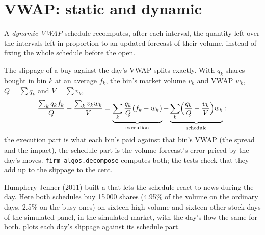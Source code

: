 \section{VWAP: static and dynamic}

\begin{definition}\label{def:mx:benchmark-algorithms:dvwap}
A \emph{dynamic VWAP} schedule recomputes, after each interval, the quantity left over the intervals left in proportion to an
updated forecast of their volume, instead of fixing the whole schedule before the open.
\end{definition}

The slippage of a buy against the day's VWAP splits exactly. With $q_k$ shares bought in bin $k$ at an average $f_k$, the bin's market volume $v_k$
and VWAP $w_k$, $Q=\sum q_k$ and $V=\sum v_k$,
\[
\frac{\sum_kq_kf_k}{Q}-\frac{\sum_kv_kw_k}{V}=\underbrace{\sum_k\frac{q_k}{Q}(f_k-w_k)}_{\text{execution}}+\underbrace{\sum_k\Bigl(\frac{q_k}{Q}-\frac{v_k}{V}\Bigr)w_k}_{\text{schedule}}:
\]
the execution part is what each bin's  paid against that bin's VWAP (the spread and the impact), the schedule part is the volume
forecast's error priced by the day's moves. \texttt{firm\_algos.decompose} computes both; the tests check that they add up to the slippage to the
cent.

\label{lst:mx:benchmark-algorithms:schedules}

Humphery-Jenner (2011) built a  that lets the schedule react to news during the day. Here both schedules buy 15\,000 shares (4.95\% of the volume on
the ordinary days, 2.5\% on the busy ones) on sixteen high-volume and sixteen other stock-days of the simulated panel, in the simulated market, with
the day's flow the same for both.
 plots each day's slippage against its schedule part.

